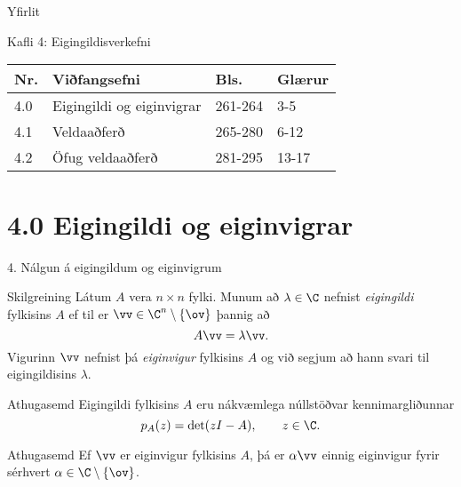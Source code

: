 \date{24.~janúar 2014}



\begin{frame}
	\maketitle
\end{frame}

\section*{}
\begin{frame}{Yfirlit}
\begin{block}{Kafli 4: Eigingildisverkefni}
\begin{center}
\begin{tabular}{|l|l|l|l|}\hline
Nr. &Viðfangsefni & Bls. & Glærur\\
\hline
4.0 & Eigingildi og eiginvigrar & 261-264 & 3-5\\
4.1 & Veldaaðferð & 265-280 & 6-12\\
4.2 & Öfug veldaaðferð & 281-295 & 13-17\\
\hline
\end{tabular}
\end{center}

\end{block}
\end{frame}

\section*{4.0 Eigingildi og eiginvigrar}

\begin{frame}{4. Nálgun á eigingildum og eiginvigrum} 
\begin{block}{Skilgreining}
Látum $A$ vera $n\times n$ fylki.  Munum að  $\lambda\in \C$ nefnist
{\it eigingildi} fylkisins $A$ ef til er $\vv\in \C^n\setminus\{\ov\}$ 
þannig að 
$$
A\vv=\lambda\vv.
$$
\pause
Vigurinn $\vv$ nefnist þá {\it eiginvigur } fylkisins $A$ og við
segjum að hann svari til eigingildisins $\lambda$.
\end{block}

\pause
\begin{block}{Athugasemd}
Eigingildi fylkisins $A$ eru nákvæmlega núllstöðvar kennimargliðunnar
$$
p_A(z)=\det(zI-A), \qquad z\in \C.
$$
\end{block}
\pause

\begin{block}{Athugasemd}
Ef $\vv$ er eiginvigur fylkisins $A$, þá er $\alpha \vv$ einnig
eiginvigur fyrir sérhvert $\alpha\in \C\setminus \{\ov\}$. 
\end{block}
\end{frame}


